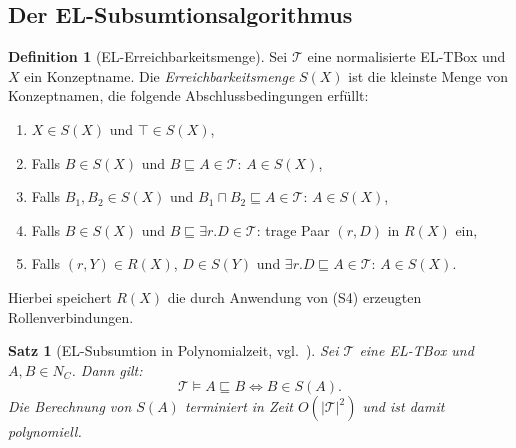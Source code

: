 ﻿\documentclass[a4paper,12pt]{article}
\theoremstyle{definition}
\newtheorem{definition}{Definition}[section]
\theoremstyle{plain}
\newtheorem{satz}{Satz}[section]
\theoremstyle{remark}
\newcommand{\Tbox}{\ensuremath{\mathcal{T}}}
\begin{document}
\subsection{Der EL-Subsumtionsalgorithmus}

\begin{definition}[EL-Erreichbarkeitsmenge]
\label{def:el-set}
Sei $\Tbox$ eine normalisierte \textsf{EL}-TBox und $X$ ein Konzeptname.
Die \emph{Erreichbarkeitsmenge} $S(X)$ ist die kleinste Menge von
Konzeptnamen, die folgende Abschlussbedingungen erf{\"{u}}llt:
\begin{enumerate}[label=(S\arabic*)]
  \item $X \in S(X)$ und $\top \in S(X)$,
  \item Falls $B \in S(X)$ und $B \sqsubseteq A \in \Tbox$:
        $A \in S(X)$,
  \item Falls $B_1, B_2 \in S(X)$ und
        $B_1 \sqcap B_2 \sqsubseteq A \in \Tbox$:
        $A \in S(X)$,
  \item Falls $B \in S(X)$ und $B \sqsubseteq \exists r.D \in \Tbox$:
        trage Paar $(r, D)$ in $R(X)$ ein,
  \item Falls $(r, Y) \in R(X)$, $D \in S(Y)$ und
        $\exists r.D \sqsubseteq A \in \Tbox$:
        $A \in S(X)$.
\end{enumerate}
Hierbei speichert $R(X)$ die durch Anwendung von (S4) erzeugten
Rollenverbindungen.
\end{definition}

\begin{satz}[EL-Subsumtion in Polynomialzeit, vgl.~\cite{Baader2005}]
\label{satz:el-poly}
Sei $\Tbox$ eine \textsf{EL}-TBox und $A, B \in N_C$.
Dann gilt:
\[
  \Tbox \models A \sqsubseteq B
  \iff B \in S(A).
\]
Die Berechnung von $S(A)$ terminiert in Zeit
$O(|\Tbox|^2)$ und ist damit polynomiell.
\end{satz}
\end{document}
